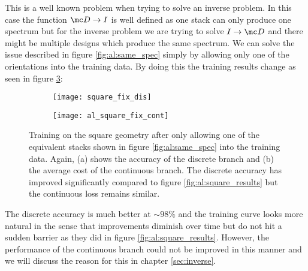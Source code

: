 \newpage
This is a well known problem when trying to solve an inverse problem. In this case the function $\mc D \rightarrow I$ is well defined as one stack can only produce one spectrum but for the inverse problem we are trying to solve $I \rightarrow \mc D$ and there might be multiple designs which produce the same spectrum. We can solve the issue described in figure \ref{fig:al:same_spec} simply by allowing only one of the orientations into the training data. By doing this the training  results change as seen in figure \ref{fig:al:squares_fix}:

\begin{figure}[H]
\centering
\begin{subfigure}{.5\textwidth}
    \centering
    \texttt{[image: square\_fix\_dis]}
    \caption{}
    \label{}
\end{subfigure}%
\begin{subfigure}{.5\textwidth}
    \centering
    \texttt{[image: al\_square\_fix\_cont]}
    \caption{}
    \label{}
\end{subfigure}
\caption{Training on the square geometry after only allowing one of the equivalent stacks shown in figure \ref{fig:al:same_spec} into the training data.
Again, (a) shows the accuracy of the discrete branch and (b) the average cost of the continuous branch. The discrete accuracy has improved significantly compared to figure \ref{fig:al:square_results} but the continuous loss remains similar.}
\label{fig:al:squares_fix}
\end{figure}

The discrete accuracy is much better at $\sim 98 \%$ and the training curve looks more natural in the sense that improvements diminish over time but do not hit a sudden barrier as they did in figure \ref{fig:al:square_results}. However, the performance of the continuous branch could not be improved in this manner and we will discuss the reason for this in chapter \ref{sec:inverse}.
